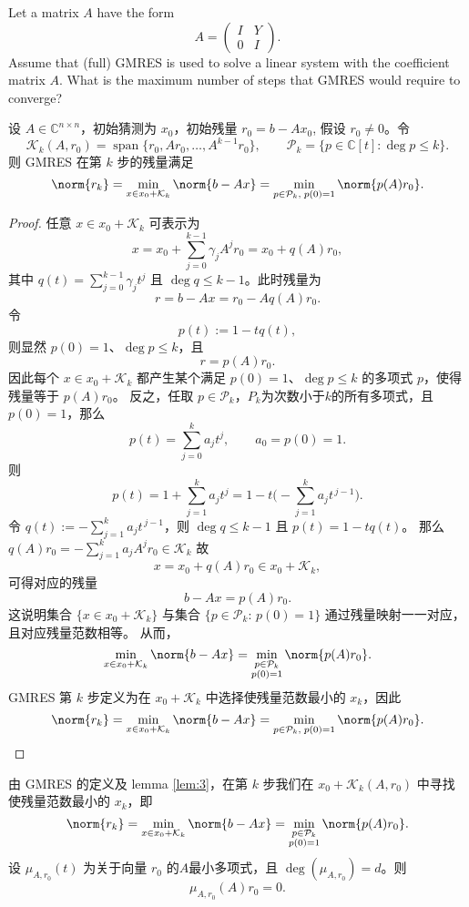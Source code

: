\documentclass{ctexart}
\begin{document}
\begin{problem}
  Let a matrix \( A \) have the form
  \[
    A =
    \begin{pmatrix}
      I & Y \\
      0 & I
    \end{pmatrix}.
  \]
  Assume that (full) GMRES is used to solve a linear system with the coefficient matrix \( A \).
  What is the maximum number of steps that GMRES would require to converge?
\end{problem}
\begin{solution}
  \begin{lemma}\label{lem:3}
    设 \(A\in\mathbb C^{n\times n}\)，初始猜测为 \(x_0\)，初始残量 \(r_0=b-Ax_0\), 假设 \(r_0\neq0\)。令
    \[
      \mathcal K_k(A,r_0)=\operatorname{span}\{r_0,Ar_0,\dots,A^{k-1}r_0\},
      \qquad
      \mathcal P_k=\{p\in\mathbb C[t]:\deg p\le k\}.
    \]
    则 GMRES 在第 \(k\) 步的残量满足
    \[
      \norm{r_k}=\min_{x\in x_0+\mathcal K_k}\norm{b-Ax}
      =\min_{p\in\mathcal P_k,\;p(0)=1}\norm{p(A)r_0}.
    \]
  \end{lemma}
  \begin{proof}
    任意 \(x\in x_0+\mathcal K_k\) 可表示为
    \[
      x=x_0+\sum_{j=0}^{k-1}\gamma_j A^j r_0
      = x_0 + q(A) r_0,
    \]
    其中 \(q(t)=\sum_{j=0}^{k-1}\gamma_j t^j\) 且 \(\deg q\le k-1\)。此时残量为
    \[
      r=b-Ax = r_0 - A q(A) r_0.
    \]
    令
    \[
      p(t):=1 - t q(t),
    \]
    则显然 \(p(0)=1\)、\(\deg p\le k\)，且
    \[
      r = p(A) r_0.
    \]
    因此每个 \(x\in x_0+\mathcal K_k\) 都产生某个满足 \(p(0)=1\)、\(\deg p\le k\) 的多项式 \(p\)，使得残量等于 \(p(A)r_0\)。
    反之，任取 \(p\in\mathcal P_k\)，\(P_k \)为次数小于\(k \)的所有多项式，且 \(p(0)=1\)，那么
    \[
      p(t)=\sum_{j=0}^k a_j t^j,\qquad a_0=p(0)=1.
    \]
    则
    \[
      p(t)=1 + \sum_{j=1}^k a_j t^j = 1 - t\Big(-\sum_{j=1}^k a_j t^{\,j-1}\Big).
    \]
    令 \(q(t):=-\sum_{j=1}^k a_j t^{\,j-1}\)，则 \(\deg q\le k-1\) 且 \(p(t)=1-tq(t)\)。
    那么\(q(A)r_0=-\sum_{j=1}^{k}a_jA^jr_0 \in \mathcal{K}_k \)
    故
    \[
      x = x_0 + q(A) r_0 \in x_0+\mathcal K_k,
    \]
    可得对应的残量
    \[
      b-Ax = p(A) r_0.
    \]
    这说明集合 \(\{x\in x_0+\mathcal K_k\}\) 与集合 \(\{p\in\mathcal P_k:\,p(0)=1\}\) 通过残量映射一一对应，且对应残量范数相等。
    从而，
    \[
      \min_{x\in x_0+\mathcal K_k}\norm{b-Ax}
      = \min_{\substack{p\in\mathcal P_k\\ p(0)=1}} \norm{p(A) r_0}.
    \]
    GMRES 第 \(k\) 步定义为在 \(x_0+\mathcal K_k\) 中选择使残量范数最小的 \(x_k\)，因此
    \[
      \norm{r_k}=\min_{x\in x_0+\mathcal K_k}\norm{b-Ax}
      =\min_{p\in\mathcal P_k,\;p(0)=1}\norm{p(A)r_0}.
    \]
  \end{proof}
  由 GMRES 的定义及 lemma \ref{lem:3}，在第 \(k\) 步我们在 \(x_0+\mathcal K_k(A,r_0)\) 中寻找使残量范数最小的 \(x_k\)，即
  \[
    \norm{r_k}=\min_{x\in x_0+\mathcal K_k}\norm{b-Ax}
    =\min_{\substack{p\in\mathcal P_k\\ p(0)=1}}\norm{p(A)r_0}.
  \]
  设 \(\mu_{A,r_0}(t)\) 为关于向量 \(r_0\) 的\(A \)最小多项式，且 \(\deg(\mu_{A,r_0})=d\)。则
  \[
    \mu_{A,r_0}(A) r_0 = 0.
  \]


\end{solution}
\end{document}
